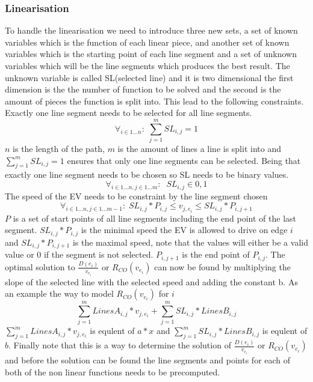 \subsubsection{Linearisation}
To handle the linearisation we need to introduce three new sets, a set of known variables which is the function of each linear piece, and another set of known variables which is the starting point of each line segment and a set of unknown variables which will be the line segments which produces the best result. The unknown variable is called SL(selected line) and it is two dimensional the first dimension is the the number of function to be solved and the second is the amount of pieces the function is split into. This lead to the following constraints.   
Exactly one line segment needs to be selected for all line segments. 
\begin{equation*}
\forall_{i\in1 \dots n }:\; \sum_{j=1}^{m} SL_{i,j} = 1
\end{equation*}
$n$ is the length of the path, $m$ is the amount of lines a line is split into and $\sum_{j=1}^{m} SL_{i,j} = 1$ ensures that only one line segments can be selected. 
Being that exactly one line segment needs to be chosen so SL needs to be binary values. 
\begin{equation*}
\forall_{i\in1 \dots n, j \in 1 \dots m}: \; \; SL_{i,j} \in{0,1} 
\end{equation*}
The speed of the EV needs to be constraint by the line segment chosen
\begin{equation*}
\forall_{i\in1 \dots n, j \in 1 \dots m-1}:\; SL_{i,j} * P_{i,j}  \le  v_{j,e_i} \le SL_{i,j}*P_{i,j+1}
\end{equation*}
$P$ is a set of start points of all line segments including the end point of the last segment. $SL_{i,j} * P_{i,j}$ is the minimal speed the EV is allowed to drive on edge $i$ and $SL_{i,j}*P_{i,j+1}$ is the maximal speed, note that the values will either be a valid value or $0$ if the segment is not selected. $P_{i,j+1}$ is the end point of $P_{i,j}$. 
The optimal solution to $\frac{D(e_i)}{v_{e_i}}$ or $R_{CO}(v_{e_i})$ can now be found by multiplying the slope of the selected line with the selected speed and adding the constant b. As an example the way to model $R_{CO}(v_{e_i})$ for $i$
\begin{equation*}
\sum_{j=1}^{m} LinesA_{i,j}*v_{j,e_i} + \sum_{j=1}^{m} SL_{i,j}*LinesB_{i,j} 
\end{equation*}
$\sum_{j=1}^{m} LinesA_{i,j}*v_{j,e_i}$ is equlent of $a*x$ and $\sum_{j=1}^{m} SL_{i,j}*LinesB_{i,j}$ is equlent of $b$. 
Finally note that this is a way to determine the solution of $\frac{D(e_i)}{v_{e_i}}$ or $R_{CO}(v_{e_i})$ and before the solution can be found the line segments and points for each of both of the non linear functions needs to be precomputed. 



